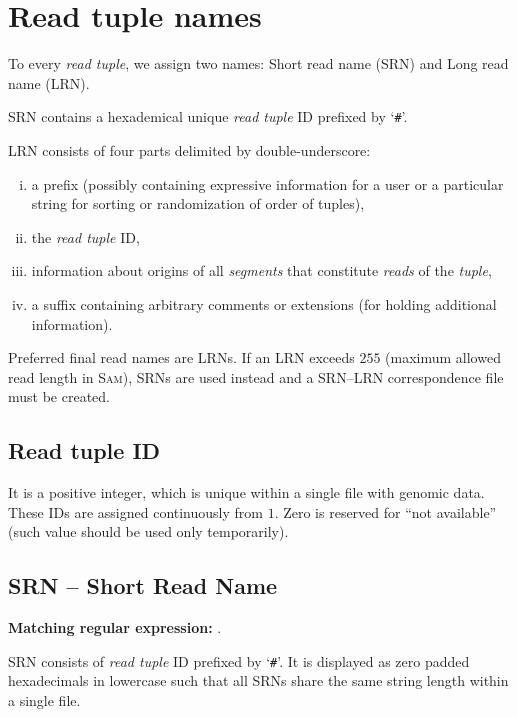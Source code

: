 \documentclass[10pt,a4paper]{article}
\newcommand{\re}[1]{\framebox{\mbox{\texttt{#1}}}}
\newcommand{\mre}[1]{\hspace{0.5cm}\textbf{Matching regular expression:} \re{#1}\smallskip}
\newcommand{\SAM}{\textsc{Sam}}
\begin{document}

\section{Read tuple names}

To every {\em read tuple}, we assign two names: {Short read name} ({SRN}) and {Long read name} ({LRN}).

\medskip

{SRN} contains a hexademical unique {\em read tuple} ID prefixed by `\texttt{\#}'.

\medskip

{LRN} consists of
four parts delimited by double-underscore:
\begin{enumerate}[i)]
	\item a prefix (possibly containing expressive 
information for a user or a particular string
for sorting or randomization of order of tuples),
	\item the {\em read tuple} ID,
	\item information about origins of all {\em segments} that constitute {\em reads} of the {\em tuple},
	\item a suffix containing arbitrary comments or extensions (for holding additional information).
\end{enumerate}


\medskip

Preferred final read names are {LRNs}. If an {LRN} exceeds $255$ (maximum allowed read length in 
\SAM), 
{SRNs} are used instead and a SRN--LRN correspondence file must be created. 




\subsection{Read tuple ID}

It is a positive integer, which is unique within a single file with genomic data.
These IDs are assigned continuously from $1$. Zero is reserved for ``not available'' (such value should be used only temporarily).



\subsection{SRN -- Short Read Name}
\mre{\char92\char35([0-9a-f]+)}.

{SRN} consists of {\em read tuple} ID prefixed by
`\texttt{\#}'.
It is displayed as zero padded hexadecimals in lowercase such 
that all {SRN}s share the same string
length within a single file.
\end{document}
